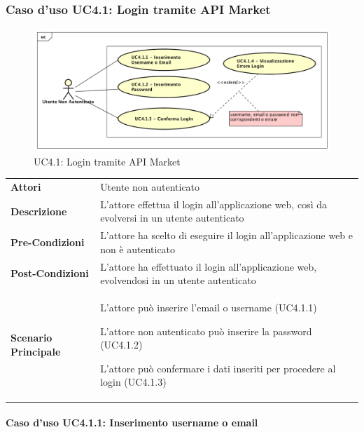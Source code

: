 \newpage
\subsubsection{Caso d'uso UC4.1: Login tramite API Market}
\label{UC4_1}
\begin{figure}[!htbp]
	\centering
	\includegraphics[scale=0.45]{UML/UC4_1.png}
	\caption{UC4.1: Login tramite API Market}
\end{figure}

\begin{tabular}{ l | p{11cm}}
	\hline
	\rowcolor{Gray}
	 \multicolumn{2}{c}{UC4.1 - Login tramite API Market} \\
	 \hline
	\textbf{Attori} & Utente non autenticato \\
	\textbf{Descrizione} & L'attore effettua il login all'applicazione web, così da evolversi in un utente autenticato\\
	\textbf{Pre-Condizioni} & L'attore ha scelto di eseguire il login all'applicazione web e non è autenticato \\
	\textbf{Post-Condizioni} & L'attore ha effettuato il login all'applicazione web, evolvendosi in un utente autenticato \\
	\textbf{Scenario Principale} & 
	\begin{enumerate*}[label=(\arabic*.),itemjoin={\newline}]
		\item L'attore può inserire l'email o username (UC4.1.1)
		\item L'attore non autenticato può inserire la password (UC4.1.2)
		\item L'attore può confermare i dati inseriti per procedere al login (UC4.1.3)
	\end{enumerate*}\\
\end{tabular}


\paragraph{Caso d'uso UC4.1.1:  Inserimento username o email}
\label{UC4_1_1}

